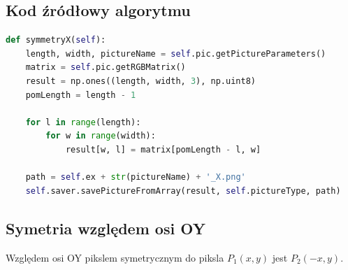 \documentclass[a4paper,12pt, titlepage]{report}
\begin{document}
\subsection*{Kod źródłowy algorytmu}
\begin{lstlisting}[language=Python]
def symmetryX(self):
    length, width, pictureName = self.pic.getPictureParameters()
    matrix = self.pic.getRGBMatrix()
    result = np.ones((length, width, 3), np.uint8)
    pomLength = length - 1

    for l in range(length):
        for w in range(width):
            result[w, l] = matrix[pomLength - l, w]

    path = self.ex + str(pictureName) + '_X.png'
    self.saver.savePictureFromArray(result, self.pictureType, path)
\end{lstlisting}

\subsection{Symetria względem osi OY}
\par Względem osi OY pikslem symetrycznym do piksla \(P_{1}(x,y)\) jest \(P_{2}(-x,y)\).
\end{document}
